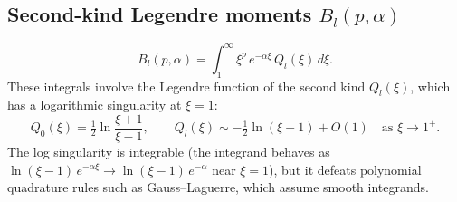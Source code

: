 \documentclass[aps,pra,twocolumn,superscriptaddress,longbibliography]{revtex4-2}
\begin{document}
\subsection{Second-kind Legendre moments
\texorpdfstring{$B_l(p, \alpha)$}{Bl(p, alpha)}}
\label{sec:Bl_closed}

\begin{equation}
  B_l(p, \alpha) = \int_1^\infty\xi^p\,e^{-\alpha\xi}\,
  Q_l(\xi)\,d\xi.
  \label{eq:Bl_def}
\end{equation}
These integrals involve the Legendre function of the second
kind $Q_l(\xi)$, which has a logarithmic singularity at
$\xi = 1$:
\begin{equation}
  Q_0(\xi) = \tfrac{1}{2}\ln\frac{\xi+1}{\xi-1},
  \qquad Q_l(\xi) \sim -\tfrac{1}{2}\ln(\xi-1) + O(1)
  \quad\text{as }\xi\to 1^+.
  \label{eq:Ql_singularity}
\end{equation}
The log singularity is integrable (the integrand behaves as
$\ln(\xi-1)\,e^{-\alpha\xi} \to \ln(\xi-1)\,e^{-\alpha}$
near $\xi = 1$), but it defeats polynomial quadrature rules
such as Gauss--Laguerre, which assume smooth integrands.
\end{document}
